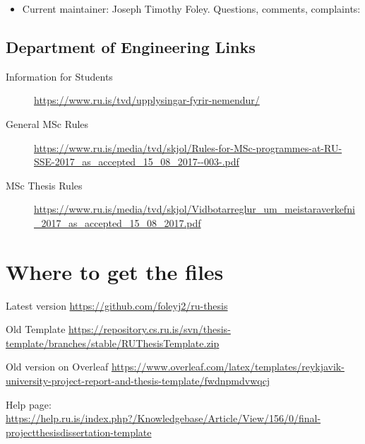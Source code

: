 \begin{itemize}
\item Current maintainer: Joseph Timothy Foley.
  Questions, comments, complaints:  

\end{itemize}

\subsection{Department of Engineering Links}
\begin{description}
\item[Information for Students] \url{https://www.ru.is/tvd/upplysingar-fyrir-nemendur/}
\item[General MSc Rules] \url{https://www.ru.is/media/tvd/skjol/Rules-for-MSc-programmes-at-RU-SSE-2017_as_accepted_15_08_2017--003-.pdf}
\item[MSc Thesis Rules] \url{https://www.ru.is/media/tvd/skjol/Vidbotarreglur_um_meistaraverkefni_2017_as_accepted_15_08_2017.pdf}
\end{description}

\section{Where to get the files}
Latest version
\url{https://github.com/foleyj2/ru-thesis}

Old Template
\url{https://repository.cs.ru.is/svn/thesis-template/branches/stable/RUThesisTemplate.zip}

Old version on Overleaf
\url{https://www.overleaf.com/latex/templates/reykjavik-university-project-report-and-thesis-template/fwdnpmdvwqcj}


Help page:
\url{https://help.ru.is/index.php?/Knowledgebase/Article/View/156/0/final-projectthesisdissertation-template}


